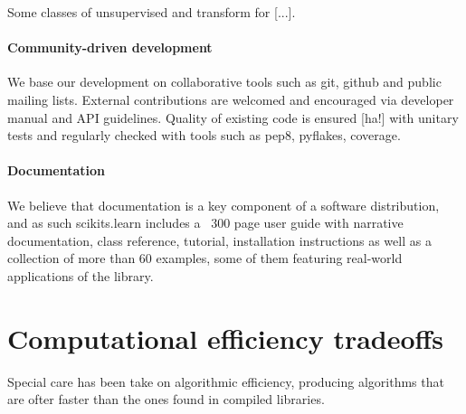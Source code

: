 \documentclass[twoside,11pt]{article}
\begin{document}
Some classes of unsupervised  and transform for [...].




\paragraph{Community-driven development}

We base our development on collaborative tools such as git, github and
public mailing lists. External contributions are welcomed and
encouraged via developer manual and API guidelines. Quality of
existing code is ensured [ha!] with unitary tests and regularly
checked with tools such as pep8, pyflakes, coverage.




\paragraph{Documentation}

We believe that documentation is a key component of a software
distribution, and as such scikits.learn includes a ~300 page user
guide with narrative documentation, class reference, tutorial,
installation instructions as well as a collection of more than 60
examples, some of them featuring real-world applications of the
library.


\section{Computational efficiency tradeoffs}


Special care has been take on algorithmic efficiency, producing
algorithms that are ofter faster than the ones found in compiled
libraries.
\end{document}
